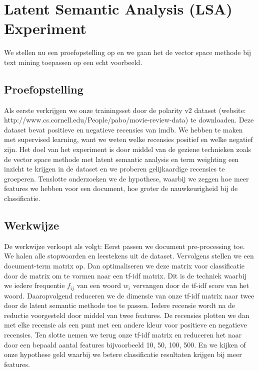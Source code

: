 \section{Latent Semantic Analysis (LSA) Experiment}\label{Latent Semantic Analysis Experiment (LSA) Experiment}

We stellen nu een proefopstelling op en we gaan het de vector space methode bij text mining toepassen op een echt voorbeeld.

\subsection{Proefopstelling}\label{Proefopstelling}
Als eerste verkrijgen we onze trainingsset door de polarity v2 dataset (website: http://www.cs.cornell.edu/People/pabo/movie-review-data) te downloaden. Deze dataset bevat positieve en negatieve recensies van imdb. We hebben te maken met supervised learning, want we weten welke recensies positief en welke negatief zijn. Het doel van het experiment is door middel van de geziene technieken zoals de vector space methode met latent semantic analysis en term weighting een inzicht te krijgen in de dataset en we proberen gelijkaardige recensies te groeperen. Tenslotte onderzoeken we de hypothese, waarbij we zeggen hoe meer features we hebben voor een document, hoe groter de nauwkeurigheid bij de classificatie.


\subsection{Werkwijze}\label{Werkwijze}

De werkwijze verloopt als volgt:
Eerst passen we document pre-processing toe. We halen alle stopwoorden en leestekens uit de dataset. Vervolgens stellen we een document-term matrix op. Dan optimaliseren we deze matrix voor classificatie door de matrix om te vormen naar een tf-idf matrix. Dit is de techniek waarbij we iedere frequentie $f_{ij}$ van een woord $w_{i}$ vervangen door de tf-idf score van het woord. Daaropvolgend reduceren we de dimensie van onze tf-idf matrix naar twee door de latent semantic methode toe te passen. Iedere recensie wordt na de reductie voorgesteld door middel van twee features. 
De recensies plotten we dan met elke recensie als een punt met een andere kleur voor positieve en negatieve recensies.
Ten slotte nemen we terug onze tf-idf matrix en reduceren het naar door een bepaald aantal features bijvoorbeeld 10, 50, 100, 500. En we kijken of onze hypothese geld waarbij we betere classificatie resultaten krijgen bij meer features.

